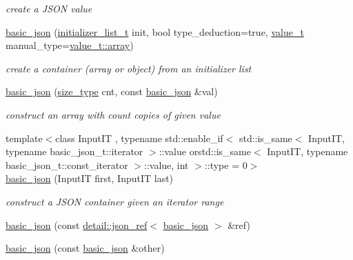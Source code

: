 \begin{DoxyCompactItemize}
\begin{DoxyCompactList}\small\item\em create a J\+S\+ON value \end{DoxyCompactList}\item 
\hyperlink{classnlohmann_1_1basic__json_ab5dfd9a2b2663b219641cb7fe59b6da2}{basic\+\_\+json} (\hyperlink{classnlohmann_1_1basic__json_a670f6a0eb3d1e0ffd00c27d35472ccc9}{initializer\+\_\+list\+\_\+t} init, bool type\+\_\+deduction=true, \hyperlink{namespacenlohmann_1_1detail_a90aa5ef615aa8305e9ea20d8a947980f}{value\+\_\+t} manual\+\_\+type=\hyperlink{namespacenlohmann_1_1detail_a90aa5ef615aa8305e9ea20d8a947980faf1f713c9e000f5d3f280adbd124df4f5}{value\+\_\+t\+::array})
\begin{DoxyCompactList}\small\item\em create a container (array or object) from an initializer list \end{DoxyCompactList}\item 
\hyperlink{classnlohmann_1_1basic__json_ab6816ae5100409254ed0a8bc21c387bb}{basic\+\_\+json} (\hyperlink{classnlohmann_1_1basic__json_a39f2cd0b58106097e0e67bf185cc519b}{size\+\_\+type} cnt, const \hyperlink{classnlohmann_1_1basic__json}{basic\+\_\+json} \&val)
\begin{DoxyCompactList}\small\item\em construct an array with count copies of given value \end{DoxyCompactList}\item 
{\footnotesize template$<$class Input\+IT , typename std\+::enable\+\_\+if$<$ std\+::is\+\_\+same$<$ Input\+I\+T, typename basic\+\_\+json\+\_\+t\+::iterator $>$\+::value orstd\+::is\+\_\+same$<$ Input\+I\+T, typename basic\+\_\+json\+\_\+t\+::const\+\_\+iterator $>$\+::value, int $>$\+::type  = 0$>$ }\\\hyperlink{classnlohmann_1_1basic__json_abe197e9f3184487805cfb5bba6fd5938}{basic\+\_\+json} (Input\+IT first, Input\+IT last)
\begin{DoxyCompactList}\small\item\em construct a J\+S\+ON container given an iterator range \end{DoxyCompactList}\item 
\hyperlink{classnlohmann_1_1basic__json_a2be0a411fe0e3418abc4c58889be4943}{basic\+\_\+json} (const \hyperlink{classnlohmann_1_1detail_1_1json__ref}{detail\+::json\+\_\+ref}$<$ \hyperlink{classnlohmann_1_1basic__json}{basic\+\_\+json} $>$ \&ref)
\item 
\hyperlink{classnlohmann_1_1basic__json_af5de621bcf646c332343f9c1e011126c}{basic\+\_\+json} (const \hyperlink{classnlohmann_1_1basic__json}{basic\+\_\+json} \&other)

\end{DoxyCompactItemize}
